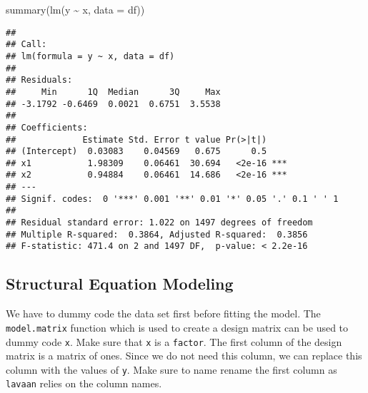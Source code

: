 \documentclass[
]{book}
\newenvironment{Shaded}{\begin{snugshade}}{\end{snugshade}}
\newcommand{\AttributeTok}[1]{\textcolor[rgb]{0.77,0.63,0.00}{#1}}
\newcommand{\DecValTok}[1]{\textcolor[rgb]{0.00,0.00,0.81}{#1}}
\newcommand{\FunctionTok}[1]{\textcolor[rgb]{0.00,0.00,0.00}{#1}}
\newcommand{\NormalTok}[1]{#1}
\newcommand{\OtherTok}[1]{\textcolor[rgb]{0.56,0.35,0.01}{#1}}
\newcommand{\SpecialCharTok}[1]{\textcolor[rgb]{0.00,0.00,0.00}{#1}}
\newcommand{\StringTok}[1]{\textcolor[rgb]{0.31,0.60,0.02}{#1}}
\theoremstyle{definition}
\theoremstyle{definition}
\theoremstyle{definition}
\theoremstyle{remark}
\begin{document}
\begin{Shaded}
\begin{Highlighting}[]
\FunctionTok{summary}\NormalTok{(}\FunctionTok{lm}\NormalTok{(y }\SpecialCharTok{\textasciitilde{}}\NormalTok{ x, }\AttributeTok{data =}\NormalTok{ df))}
\end{Highlighting}
\end{Shaded}

\begin{verbatim}
## 
## Call:
## lm(formula = y ~ x, data = df)
## 
## Residuals:
##     Min      1Q  Median      3Q     Max 
## -3.1792 -0.6469  0.0021  0.6751  3.5538 
## 
## Coefficients:
##             Estimate Std. Error t value Pr(>|t|)    
## (Intercept)  0.03083    0.04569   0.675      0.5    
## x1           1.98309    0.06461  30.694   <2e-16 ***
## x2           0.94884    0.06461  14.686   <2e-16 ***
## ---
## Signif. codes:  0 '***' 0.001 '**' 0.01 '*' 0.05 '.' 0.1 ' ' 1
## 
## Residual standard error: 1.022 on 1497 degrees of freedom
## Multiple R-squared:  0.3864, Adjusted R-squared:  0.3856 
## F-statistic: 471.4 on 2 and 1497 DF,  p-value: < 2.2e-16
\end{verbatim}

\hypertarget{structural-equation-modeling-1}{%
\subsection{Structural Equation Modeling}\label{structural-equation-modeling-1}}

We have to dummy code the data set first before fitting the model.
The \texttt{model.matrix} function which is used to create a design matrix
can be used to dummy code \texttt{x}.
Make sure that \texttt{x} is a \texttt{factor}.
The first column of the design matrix is a matrix of ones.
Since we do not need this column,
we can replace this column with the values of \texttt{y}.
Make sure to name rename the first column
as \texttt{lavaan} relies on the column names.

\begin{Shaded}
\end{Shaded}
\end{document}

